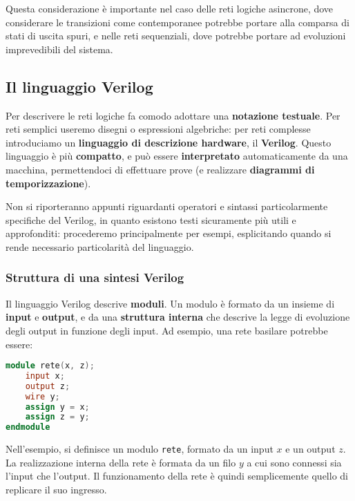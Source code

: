 \documentclass[a4paper,11pt]{article}
\begin{document}
Questa considerazione è importante nel caso delle reti logiche asincrone, dove considerare le transizioni come contemporanee potrebbe portare alla comparsa di stati di uscita spuri, e nelle reti sequenziali, dove potrebbe portare ad evoluzioni imprevedibili del sistema.

\subsection{Il linguaggio Verilog}
Per descrivere le reti logiche fa comodo adottare una \textbf{notazione testuale}.
Per reti semplici useremo disegni o espressioni algebriche: per reti complesse introduciamo un \textbf{linguaggio di descrizione hardware}, il \textbf{Verilog}.
Questo linguaggio è più \textbf{compatto}, e può essere \textbf{interpretato} automaticamente da una macchina, permettendoci di effettuare prove (e realizzare \textbf{diagrammi di temporizzazione}).


Non si riporteranno appunti riguardanti operatori e sintassi particolarmente specifiche del Verilog, in quanto esistono testi sicuramente più utili e approfonditi: procederemo principalmente per esempi, esplicitando quando si rende necessario particolarità del linguaggio.

\subsubsection{Struttura di una sintesi Verilog}
Il linguaggio Verilog descrive \textbf{moduli}.
Un modulo è formato da un insieme di \textbf{input} e \textbf{output}, e da una \textbf{struttura interna} che descrive la legge di evoluzione degli output in funzione degli input.
Ad esempio, una rete basilare potrebbe essere:
\begin{lstlisting}[language=verilog, style=codestyle]	
module rete(x, z);
	input x;
	output z;
	wire y;
	assign y = x;
	assign z = y;
endmodule
\end{lstlisting}

Nell'esempio, si definisce un modulo \lstinline|rete|, formato da un input $x$ e un output $z$. 
La realizzazione interna della rete è formata da un filo $y$ a cui sono connessi sia l'input che l'output.
Il funzionamento della rete è quindi semplicemente quello di replicare il suo ingresso.
\end{document}
